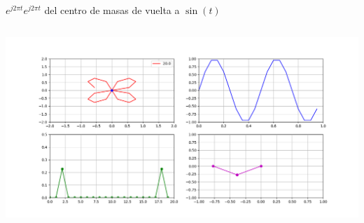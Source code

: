 \begin{frame}{$e^{j2\pi t}$}{$e^{j2\pi t}$ del centro de masas de vuelta a $\sin(t)$}
   \handsonicon
   \begin{columns}[onlytextwidth]
      
      
      \centering\includegraphics[width=1.0\textwidth]{2_clase/euler5}
   \end{columns}
   \vfill
\end{frame}

